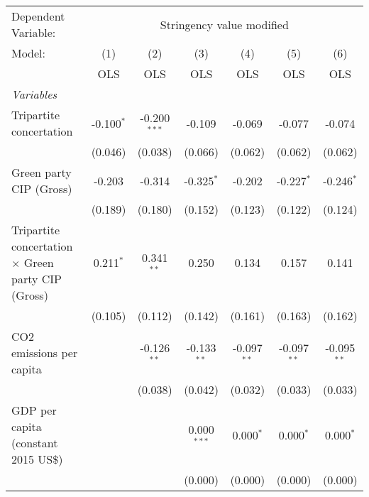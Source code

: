
\begingroup
\centering
\begin{tabular}{lcccccc}
   \toprule
   Dependent Variable: & \multicolumn{6}{c}{Stringency value modified}\\
   Model:                                                    & (1)          & (2)            & (3)           & (4)           & (5)           & (6)\\  
                                                             &  OLS         & OLS            & OLS           & OLS           & OLS           & OLS\\  
   \midrule
   \emph{Variables}\\
   Tripartite concertation                                   & -0.100$^{*}$ & -0.200$^{***}$ & -0.109        & -0.069        & -0.077        & -0.074\\   
                                                             & (0.046)      & (0.038)        & (0.066)       & (0.062)       & (0.062)       & (0.062)\\   
   Green party CIP (Gross)                                   & -0.203       & -0.314         & -0.325$^{*}$  & -0.202        & -0.227$^{*}$  & -0.246$^{*}$\\   
                                                             & (0.189)      & (0.180)        & (0.152)       & (0.123)       & (0.122)       & (0.124)\\   
   Tripartite concertation $\times$ Green party CIP (Gross)  & 0.211$^{*}$  & 0.341$^{**}$   & 0.250         & 0.134         & 0.157         & 0.141\\   
                                                             & (0.105)      & (0.112)        & (0.142)       & (0.161)       & (0.163)       & (0.162)\\   
   CO2 emissions per capita                                  &              & -0.126$^{**}$  & -0.133$^{**}$ & -0.097$^{**}$ & -0.097$^{**}$ & -0.095$^{**}$\\   
                                                             &              & (0.038)        & (0.042)       & (0.032)       & (0.033)       & (0.033)\\   
   GDP per capita (constant 2015 US\$)                       &              &                & 0.000$^{***}$ & 0.000$^{*}$   & 0.000$^{*}$   & 0.000$^{*}$\\   
                                                             &              &                & (0.000)       & (0.000)       & (0.000)       & (0.000)\\   

\end{tabular}
